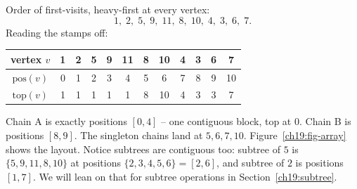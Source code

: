 \begin{labbox}
Order of first-visits, heavy-first at every vertex:
\[
  1,\;2,\;5,\;9,\;11,\;8,\;10,\;4,\;3,\;6,\;7.
\]
Reading the stamps off:
\begin{center}
\begin{tabular}{c|ccccccccccc}
vertex $v$        & 1 & 2 & 5 & 9 & 11 & 8 & 10 & 4 & 3 & 6 & 7\\\hline
$\mathrm{pos}(v)$ & 0 & 1 & 2 & 3 & 4  & 5 & 6  & 7 & 8 & 9 & 10\\
$\mathrm{top}(v)$ & 1 & 1 & 1 & 1 & 1  & 8 & 10 & 4 & 3 & 3 & 7\\
\end{tabular}
\end{center}
Chain A is exactly positions $[0,4]$ -- one contiguous block, top at $0$. Chain B is positions
$[8,9]$. The singleton chains land at $5,6,7,10$. Figure~\ref{ch19:fig-array} shows the layout.
Notice subtrees are contiguous too: subtree of $5$
is $\{5,9,11,8,10\}$ at positions $\{2,3,4,5,6\}=[2,6]$, and subtree of $2$ is positions $[1,7]$. We
will lean on that for subtree operations in Section~\ref{ch19:subtree}.
\end{labbox}

